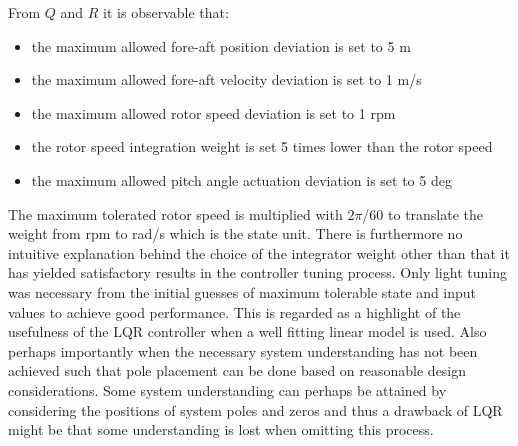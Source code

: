 From $ Q $ and $ R $ it is observable that:
\begin{itemize}
	\item the maximum allowed fore-aft position deviation is set to 5 m
	\item the maximum allowed fore-aft velocity deviation is set to 1 m/s
	\item the maximum allowed rotor speed deviation is set to 1 rpm
	\item the rotor speed integration weight is set 5 times lower than the rotor speed
	\item the maximum allowed pitch angle actuation deviation is set to 5 deg
\end{itemize}
The maximum tolerated rotor speed is multiplied with $ 2 \pi $/$ 60 $ to translate the weight from rpm to rad/s which is the state unit. There is furthermore no intuitive explanation behind the choice of the integrator weight other than that it has yielded satisfactory results in the controller tuning process. Only light tuning was necessary from the initial guesses of maximum tolerable state and input values to achieve good performance. This is regarded as a highlight of the usefulness of the LQR controller when a well fitting linear model is used. Also perhaps importantly when the necessary system understanding has not been achieved such that pole placement can be done based on reasonable design considerations. Some system understanding can perhaps be attained by considering the positions of system poles and zeros and thus a drawback of LQR might be that some understanding is lost when omitting this process.






